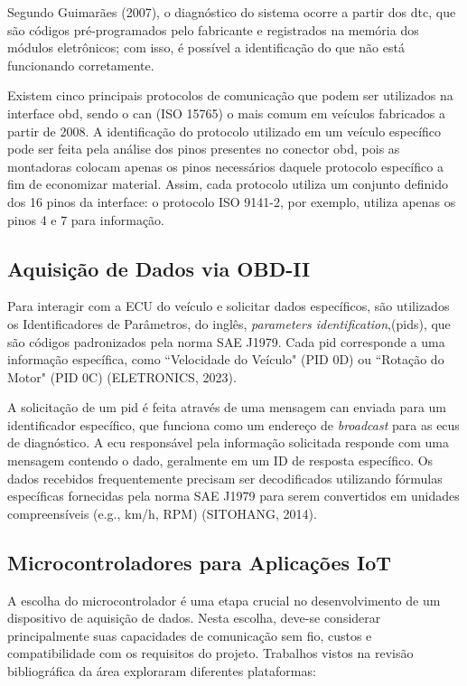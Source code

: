\documentclass[a4paper, 12pt]{article}
\begin{document}
Segundo Guimarães (2007), o diagnóstico do sistema ocorre a partir dos \acrshort{dtc}, que são códigos pré-programados pelo fabricante e registrados na memória dos módulos eletrônicos; com isso, é possível a identificação do que não está funcionando corretamente.

Existem cinco principais protocolos de comunicação que podem ser utilizados na interface \acrshort{obd}, sendo o \acrshort{can} (ISO 15765) o mais comum em veículos fabricados a partir de 2008. A identificação do protocolo utilizado em um veículo específico pode ser feita pela análise dos pinos presentes no conector \acrshort{obd}, pois as montadoras colocam apenas os pinos necessários daquele protocolo específico a fim de economizar material. Assim, cada protocolo utiliza um conjunto definido dos 16 pinos da interface: o protocolo ISO 9141-2, por exemplo, utiliza apenas os pinos 4 e 7 para informação.

\subsection{Aquisição de Dados via OBD-II}

Para interagir com a ECU do veículo e solicitar dados específicos, são utilizados os Identificadores de Parâmetros, do inglês, \textit{parameters identification},(\acrshort{pid}s), que são códigos padronizados pela norma SAE J1979. Cada \acrshort{pid} corresponde a uma informação específica, como ``Velocidade do Veículo" (PID 0D) ou ``Rotação do Motor" (PID 0C) (ELETRONICS, 2023).

A solicitação de um \acrshort{pid} é feita através de uma mensagem \acrshort{can} enviada para um identificador específico, que funciona como um endereço de \textit{broadcast} para as \acrshort{ecu}s de diagnóstico. A \acrshort{ecu} responsável pela informação solicitada responde com uma mensagem contendo o dado, geralmente em um ID de resposta específico. Os dados recebidos frequentemente precisam ser decodificados utilizando fórmulas específicas fornecidas pela norma SAE J1979 para serem convertidos em unidades compreensíveis (e.g., km/h, RPM) (SITOHANG, 2014).

\subsection{Microcontroladores para Aplicações IoT}

A escolha do microcontrolador é uma etapa crucial no desenvolvimento de um dispositivo de aquisição de dados. Nesta escolha, deve-se considerar principalmente suas capacidades de comunicação sem fio, custos e compatibilidade com os requisitos do projeto. Trabalhos vistos na revisão bibliográfica da área exploraram diferentes plataformas:
\end{document}
